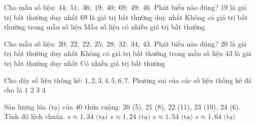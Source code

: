 \begin{ex}
	Cho mẫu số liệu: $44;\; 51;\; 36;\; 19;\; 40;\; 69;\; 49;\; 46$. Phát biểu nào đúng?
	\choice
	{$19$ là giá trị bất thường duy nhất}
	{$69$ là giá trị bất thường duy nhất}
	{\True Không có giá trị bất thường trong mẫu số liệu}
	{Mẫu số liệu có nhiều giá trị bất thường}
\end{ex}

\begin{ex}
	Cho mẫu số liệu: $20;\; 22;\; 22;\; 25;\; 28;\; 32;\; 34;\; 43$. Phát biểu nào đúng?
	\choice
	{$20$ là giá trị bất thường duy nhất}
	{\True Không có giá trị bất thường trong mẫu số liệu}
	{$43$ là giá trị bất thường duy nhất}
	{Có nhiều giá trị bất thường}
\end{ex}

\begin{ex}
	Cho dãy số liệu thống kê: $1, 2, 3, 4, 5, 6, 7$. Phương sai của các số liệu thống kê đã cho là
	\choice
	{$1$}
	{$2$}
	{$3$}
	{\True $4$}
\end{ex}

\begin{ex}
	Sản lượng lúa (tạ) của 40 thửa ruộng: 20 (5), 21 (8), 22 (11), 23 (10), 24 (6). Tính độ lệch chuẩn.
	\choice
	{$s \approx 1{,}34\text{ (tạ)}$}
	{\True $s \approx 1{,}24\text{ (tạ)}$}
	{$s \approx 1{,}54\text{ (tạ)}$}
	{$s \approx 1{,}64\text{ (tạ)}$}
\end{ex}

